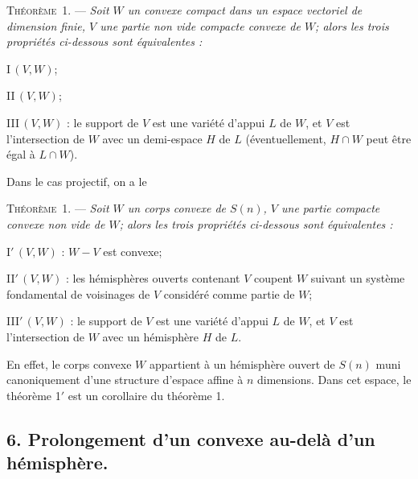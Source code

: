 \documentclass[11pt]{article}
\newcommand{\bzcf}[2]{#1}
\newcommand{\bznum}[1]{\if\relax\detokenize{#1}\relax\else\ #1\fi}
\newenvironment{theoreme}[1][]{\par\medskip\noindent\textsc{Théorème\bznum{#1}.} --- \itshape}{\par\medskip}
\newenvironment{proof}[1][]{\par}{\par}
\begin{document}
\begin{theoreme}[1]
Soit $W$ un convexe compact dans un espace vectoriel de dimension finie, $V$ une partie non vide
compacte convexe de $W$; alors les trois propriétés ci-dessous sont équivalentes :

\textup{I}\,$(V, W)$;

\textup{II}\,$(V, W)$;

\textup{III}\,$(V, W)$ : le support de $V$ est une variété d'appui $L$ de $W$, et $V$ est
l'intersection de $W$ avec un demi-espace $H$ de $L$ (éventuellement, $H\cap W$ peut être égal à
$L\cap W$).
\end{theoreme}

Dans le cas projectif, on a le

\begin{theoreme}[1]
Soit $W$ un corps convexe de $S(n)$, $V$ une partie compacte convexe non vide de $W$; alors les
trois propriétés ci-dessous sont équivalentes :

\textup{I}$'$\,$(V, W)$ : $W-V$ est convexe;

\textup{II}$'$\,$(V, W)$ : les hémisphères ouverts contenant $V$ coupent $W$ suivant un système
fondamental de voisinages de $V$ considéré comme partie de $W$;

\textup{III}$'$\,$(V, W)$ : le support de $V$ est une variété d'appui $L$ de $W$, et $V$ est
l'intersection de $W$ avec un hémisphère $H$ de $L$.
\end{theoreme}

\begin{proof}
En effet, le corps convexe $W$ appartient à un hémisphère ouvert de $S(n)$ muni canoniquement d'une
structure d'espace affine à $n$ dimensions. Dans cet espace, \bzcf{le théorème
1$'$}{\ref{bzthm:c3s5t1prime_reunion_convexes_sphere}} est un corollaire du \bzcf{théorème
1}{\ref{bzthm:c3s5t1_reunion_convexes_affine}}.
\end{proof}

\subsection*{6. Prolongement d'un convexe au-delà d'un hémisphère.}
\end{document}

